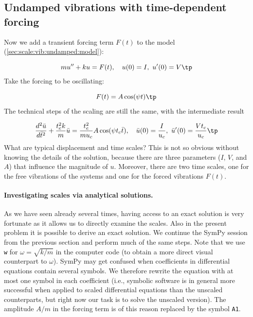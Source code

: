 \documentclass[graybox,envcountchap,sectrefs,final]{svmonodo}
\begin{document}
\subsection{Undamped vibrations with time-dependent forcing}
\label{sec:scale:vib:undamped:F}

Now we add a transient forcing term $F(t)$ to the model
(\ref{sec:scale:vib:undamped:model}):

\begin{equation}
mu'' + ku = F(t),\quad u(0)=I,\ u'(0)=V\tp
\label{sec:scale:vib:undamped:F:model}
\end{equation}
Take the forcing to be oscillating:

\[ F(t) = A\cos(\psi t)\tp\]
The technical steps of the scaling are still the same, with the
intermediate result

\begin{equation}
\frac{d^2\bar u}{d\bar t^2} + \frac{t_c^2 k}{m}\bar u =
\frac{t_c^2}{mu_c}A\cos(\psi t_c\bar t),
\quad \bar u(0)=\frac{I}{u_c},\ \bar u'(0)=\frac{Vt_c}{u_c}\tp
\label{sec:scale:vib:undamped:F:model:scaled0}
\end{equation}
What are typical displacement and time scales? This is not so obvious
without knowing the details of the solution, because there are
three parameters ($I$, $V$, and $A$) that influence the magnitude of $u$.
Moreover, there are two time scales, one for the free vibrations of
the systems and one for the forced vibrations $F(t)$.

\paragraph{Investigating scales via analytical solutions.}
As we have seen already several times, having access to
an exact solution is very fortunate as it allows us to directly
examine the scales. Also in the present problem it is possible
to derive an exact solution. We
continue the SymPy session from the previous section and perform much
of the same steps. Note that we use \texttt{w} for $\omega = \sqrt{k/m}$
in the computer code (to obtain a more direct visual counterpart to
$\omega$).
SymPy may get confused when coefficients in differential equations
contain several symbols. We therefore rewrite the equation with
at most one symbol in each coefficient (i.e., symbolic software is
in general
more successful when applied to scaled differential equations than the
unscaled counterparts, but right now our task is to solve the unscaled version).
The amplitude $A/m$ in the forcing term is of this reason
replaced by the symbol \texttt{A1}.
\end{document}
